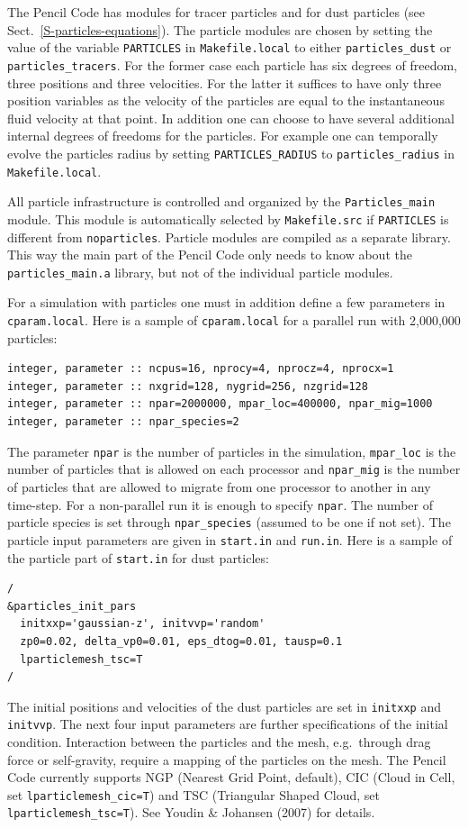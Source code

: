 \documentclass[\mydriver,12pt,twoside,notitlepage,a4paper]{article}
\newcommand{\code}[1]{\texttt{#1}}
\begin{document}
The {\sc Pencil Code} has modules for tracer particles and for dust particles
(see Sect.~\ref{S-particles-equations}). The particle modules are chosen by
setting the value of the variable \code{PARTICLES} in \code{Makefile.local} to
either \code{particles_dust} or \code{particles_tracers}. For the former case
each particle has six degrees of freedom, three positions and three
velocities. For the latter it suffices to have only three position variables
as the velocity of the particles are equal to the instantaneous fluid velocity
at that point. In addition one can choose to have several additional internal
degrees of freedoms for the particles. For example one can temporally evolve
the particles radius by setting \code{PARTICLES_RADIUS} to
\code{particles_radius} in \code{Makefile.local}.

All particle infrastructure is controlled and organized by the
\code{Particles_main} module. This module is automatically selected by
\code{Makefile.src} if \code{PARTICLES} is different from \code{noparticles}.
Particle modules are compiled as a separate library. This way the main part of
the Pencil Code only needs to know about the \code{particles_main.a} library,
but not of the individual particle modules.

For a simulation with particles one must in addition define a few parameters in
\code{cparam.local}. Here is a sample of \code{cparam.local} for a parallel run
with 2,000,000 particles:
\begin{verbatim}
integer, parameter :: ncpus=16, nprocy=4, nprocz=4, nprocx=1
integer, parameter :: nxgrid=128, nygrid=256, nzgrid=128
integer, parameter :: npar=2000000, mpar_loc=400000, npar_mig=1000
integer, parameter :: npar_species=2
\end{verbatim}
The parameter \code{npar} is the number of particles in the simulation,
\code{mpar_loc} is the number of particles that is allowed on each processor
and \code{npar_mig} is the number of particles that are allowed to migrate from
one processor to another in any time-step. For a non-parallel run it is enough
to specify \code{npar}. The number of particle species is set through
\code{npar_species} (assumed to be one if not set). The particle input
parameters are given in \code{start.in} and \code{run.in}. Here is a sample of
the particle part of \code{start.in} for dust particles:
\begin{verbatim}
/
&particles_init_pars
  initxxp='gaussian-z', initvvp='random'
  zp0=0.02, delta_vp0=0.01, eps_dtog=0.01, tausp=0.1
  lparticlemesh_tsc=T
/
\end{verbatim}
The initial positions and velocities of the dust particles are set in
\code{initxxp} and \code{initvvp}. The next four input parameters are further
specifications of the initial condition. Interaction between the particles and
the mesh, e.g.\ through drag force or self-gravity, require a mapping of the
particles on the mesh. The {\sc Pencil Code} currently supports NGP (Nearest
Grid Point, default), CIC (Cloud in Cell, set \code{lparticlemesh_cic=T}) and
TSC (Triangular Shaped Cloud, set \code{lparticlemesh_tsc=T}). See Youdin \&
Johansen (2007) for details.
\end{document}
